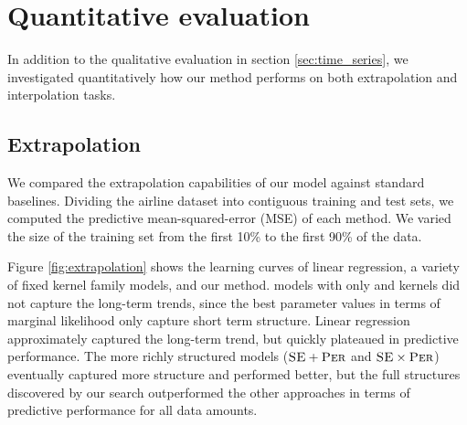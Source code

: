 \documentclass[twoside]{article}
\begin{document}
\section{Quantitative evaluation}
\label{sec:quantitative}

In addition to the qualitative evaluation in section \ref{sec:time_series}, we investigated quantitatively how our method performs on both extrapolation and interpolation tasks.

\subsection{Extrapolation}

We compared the extrapolation capabilities of our model against standard baselines.  
Dividing the airline dataset into contiguous training and test sets, we computed the predictive mean-squared-error (MSE) of each method.  
We varied the size of the training set from the first 10\% to the first 90\% of the data.

Figure \ref{fig:extrapolation} shows the learning curves of linear regression, a variety of fixed kernel family \gp{} models, and our method.  
\gp{} models with only \kSE{} and \kPer{} kernels did not capture the long-term trends, since the best parameter values in terms of \gp{} marginal likelihood only capture short term structure. 
Linear regression approximately captured the long-term trend, but quickly plateaued in predictive performance.
The more richly structured \gp{} models (${{\textsc{SE}} + {\textsc{Per}}}$ and ${{\textsc{SE}} \times {\textsc{Per}}}$) eventually captured more structure and performed better, but the full structures discovered by our search outperformed the other approaches in terms of predictive performance for all data amounts.

\end{document}
